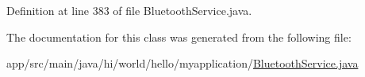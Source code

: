Definition at line 383 of file Bluetooth\+Service.\+java.



The documentation for this class was generated from the following file\+:\begin{DoxyCompactItemize}
\item 
app/src/main/java/hi/world/hello/myapplication/\mbox{\hyperlink{_bluetooth_service_8java}{Bluetooth\+Service.\+java}}\end{DoxyCompactItemize}
